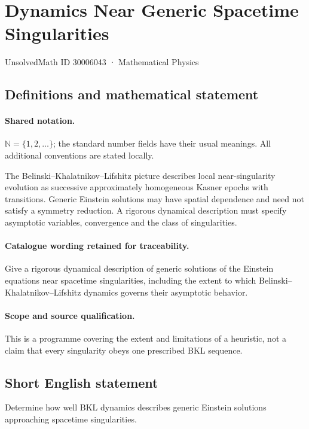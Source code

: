 \documentclass[11pt]{article}
\begin{document}
\setcounter{section}{30006042}
\section{Dynamics Near Generic Spacetime Singularities}\label{30006043}
{\small UnsolvedMath ID 30006043 · Mathematical Physics}
\subsection{Definitions and mathematical statement}

\paragraph{Shared notation.}$\mathbb N=\{1,2,\ldots\}$; the standard number fields have their usual meanings. All additional conventions are stated locally.


The Belinski--Khalatnikov--Lifshitz picture describes local near-singularity evolution as successive approximately homogeneous Kasner epochs with transitions. Generic Einstein solutions may have spatial dependence and need not satisfy a symmetry reduction. A rigorous dynamical description must specify asymptotic variables, convergence and the class of singularities.

\paragraph{Catalogue wording retained for traceability.}
Give a rigorous dynamical description of generic solutions of the Einstein equations near spacetime singularities, including the extent to which Belinski–Khalatnikov–Lifshitz dynamics governs their asymptotic behavior.

\paragraph{Scope and source qualification.}This is a programme covering the extent and limitations of a heuristic, not a claim that every singularity obeys one prescribed BKL sequence.
\subsection{Short English statement}
Determine how well BKL dynamics describes generic Einstein solutions approaching spacetime singularities.
\end{document}

